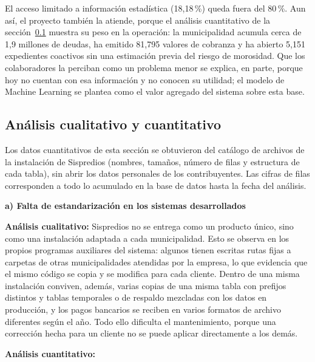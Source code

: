 \documentclass[12pt,a4paper]{report}
\newcommand{\subtitulo}[1]{\par\vspace{4pt}\noindent\textbf{#1}\par}
\begin{document}
El acceso limitado a información estadística (18,18\,\%) queda fuera del 80\,\%. Aun así, el proyecto también la atiende, porque el análisis cuantitativo de la sección~\ref{sec:analisis-cuali-cuanti} muestra su peso en la operación: la municipalidad acumula cerca de 1,9 millones de deudas, ha emitido 81,795 valores de cobranza y ha abierto 5,151 expedientes coactivos sin una estimación previa del riesgo de morosidad. Que los colaboradores la perciban como un problema menor se explica, en parte, porque hoy no cuentan con esa información y no conocen su utilidad; el modelo de Machine Learning se plantea como el valor agregado del sistema sobre esta base.

\subsection{Análisis cualitativo y cuantitativo}
\label{sec:analisis-cuali-cuanti}

Los datos cuantitativos de esta sección se obtuvieron del catálogo de archivos de la instalación de Sispredios (nombres, tamaños, número de filas y estructura de cada tabla), sin abrir los datos personales de los contribuyentes. Las cifras de filas corresponden a todo lo acumulado en la base de datos hasta la fecha del análisis.

\subtitulo{a) Falta de estandarización en los sistemas desarrollados}

\noindent\textbf{Análisis cualitativo:} Sispredios no se entrega como un producto único, sino como una instalación adaptada a cada municipalidad. Esto se observa en los propios programas auxiliares del sistema: algunos tienen escritas rutas fijas a carpetas de otras municipalidades atendidas por la empresa, lo que evidencia que el mismo código se copia y se modifica para cada cliente. Dentro de una misma instalación conviven, además, varias copias de una misma tabla con prefijos distintos y tablas temporales o de respaldo mezcladas con los datos en producción, y los pagos bancarios se reciben en varios formatos de archivo diferentes según el año. Todo ello dificulta el mantenimiento, porque una corrección hecha para un cliente no se puede aplicar directamente a los demás.

\noindent\textbf{Análisis cuantitativo:}
\end{document}
